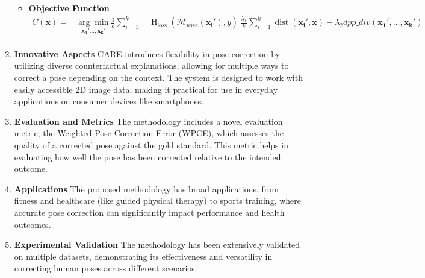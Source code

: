 \begin{enumerate}
\begin{itemize}
    \item \textbf{Objective Function} \newline
    \begin{align}
\label{eq_main}
    C(\boldsymbol{\mathbf{x}})= & \underset{\mathbf{x_1}' \ldots, \mathbf{x_k}'}{\arg \min } \frac{1}{k} \sum_{i=1}^k  \quad \operatorname{H}_{\text{loss}}\left(\mathcal{M}_{pose}\left(\mathbf{x_i}'\right), y\right) \nonumber\ \frac{\lambda_1}{k} \sum_{i=1}^k \operatorname{dist}\left(\mathbf{x_i}', \mathbf{x}\right) -\lambda_2 \textbf{$dpp\_{div}$} \left(\mathbf{x_1}', \ldots, \mathbf{x_k}'\right)\\
    \end{align}
\end{itemize}
\item \textbf{Innovative Aspects} \newline
CARE introduces flexibility in pose correction by utilizing diverse counterfactual explanations, allowing for multiple ways to correct a pose depending on the context.
The system is designed to work with easily accessible 2D image data, making it practical for use in everyday applications on consumer devices like smartphones.
\item \textbf{Evaluation and Metrics} \newline
The methodology includes a novel evaluation metric, the Weighted Pose Correction Error (WPCE), which assesses the quality of a corrected pose against the gold standard. This metric helps in evaluating how well the pose has been corrected relative to the intended outcome.
\item \textbf{Applications} \newline
The proposed methodology has broad applications, from fitness and healthcare (like guided physical therapy) to sports training, where accurate pose correction can significantly impact performance and health outcomes.
\item \textbf{Experimental Validation} \newline 
The methodology has been extensively validated on multiple datasets, demonstrating its effectiveness and versatility in correcting human poses across different scenarios.
\end{enumerate}

   

\newpage
